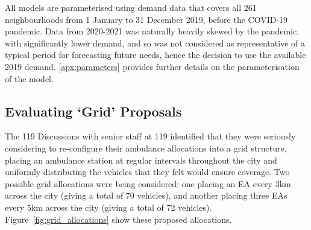 \documentclass[preprint,12pt]{elsarticle}
\begin{document}
All models are parameterised using demand data that covers all 261
neighbourhoods from 1 January to 31 December 2019, before the COVID-19
pandemic. Data from 2020-2021 was naturally heavily skewed by the pandemic,
with significantly lower demand, and so was not considered as representative
of a typical period for forecasting future needs, hence the decision to use
the available 2019 demand. \ref{apx:parameters} provides further details on the
parameterisation of the model.


\subsection{Evaluating `Grid' Proposals}\label{sec:analysis_grid}
The 119 Discussions with senior staff at 119 identified that they were seriously
considering to re-configure their ambulance allocations into a grid structure,
placing an ambulance station at regular intervals throughout the city and
uniformly distributing the vehicles that they felt would ensure coverage. Two
possible grid allocations were being considered: one placing an EA every 3km
across the city (giving a total of 70 vehicles), and another placing three EAs
every 5km across the city (giving a total of 72 vehicles).
Figure~\ref{fig:grid_allocations} show these proposed allocations.
\end{document}
